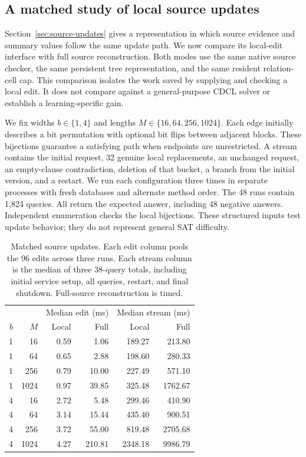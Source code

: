 \documentclass[11pt,a4paper]{article}
\numberwithin{equation}{section}
\theoremstyle{plain}
\theoremstyle{definition}
\theoremstyle{remark}
\begin{document}
\subsection{A matched study of local source updates}
\label{sec:source-study}

Section~\ref{sec:source-updates} gives a representation in which source evidence and summary values follow the same update path. We now compare its local-edit interface with full source reconstruction. Both modes use the same native source checker, the same persistent tree representation, and the same resident relation-cell cap. This comparison isolates the work saved by supplying and checking a local edit. It does not compare against a general-purpose CDCL solver or establish a learning-specific gain.

We fix widths $b\in\{1,4\}$ and lengths $M\in\{16,64,256,1024\}$. Each edge initially describes a bit permutation with optional bit flips between adjacent blocks. These bijections guarantee a satisfying path when endpoints are unrestricted. A stream contains the initial request, 32 genuine local replacements, an unchanged request, an empty-clause contradiction, deletion of that bucket, a branch from the initial version, and a restart. We run each configuration three times in separate processes with fresh databases and alternate method order. The 48 runs contain 1,824 queries. All return the expected answer, including 48 negative answers. Independent enumeration checks the local bijections. These structured inputs test update behavior; they do not represent general SAT difficulty.

\begin{table}[htbp]
\centering
\small
\begin{tabular}{rr|rr|rr}
\toprule
& & \multicolumn{2}{c|}{Median edit (ms)} & \multicolumn{2}{c}{Median stream (ms)} \\
$b$ & $M$ & Local & Full & Local & Full \\
\midrule
1 & 16   & 0.59 & 1.06   & 189.27  & 213.80 \\
1 & 64   & 0.65 & 2.88   & 198.60  & 280.33 \\
1 & 256  & 0.79 & 10.00  & 227.49  & 571.10 \\
1 & 1024 & 0.97 & 39.85  & 325.48  & 1762.67 \\
4 & 16   & 2.72 & 5.48   & 299.46  & 410.90 \\
4 & 64   & 3.14 & 15.44  & 435.40  & 900.51 \\
4 & 256  & 3.72 & 55.00  & 819.48  & 2705.68 \\
4 & 1024 & 4.27 & 210.81 & 2348.18 & 9986.79 \\
\bottomrule
\end{tabular}
\caption{Matched source updates. Each edit column pools the 96 edits across three runs. Each stream column is the median of three 38-query totals, including initial service setup, all queries, restart, and final shutdown. Full-source reconstruction is timed.}
\label{tab:source-updates}
\end{table}
\end{document}
